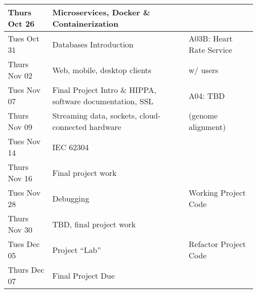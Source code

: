 \begin{longtable}[c]{|l|l|l|}
    Thurs Oct 26    & 
        Microservices, Docker \& Containerization & \\
    \hline
    Tues Oct 31     & 
        Databases Introduction & 
        A03B: Heart Rate Service \\
    Thurs Nov 02    & 
        Web, mobile, desktop clients & 
        w/ users\\
    \hline
    Tues Nov 07     & 
        Final Project Intro \& HIPPA, software documentation, SSL & 
        A04: TBD \\
    Thurs Nov 09    & 
        Streaming data, sockets, cloud-connected hardware & 
        (genome alignment) \\
    \hline
    Tues Nov 14     & 
        IEC 62304 & \\
    Thurs Nov 16    & 
        Final project work & \\
    \hline
    Tues Nov 28     & 
        Debugging & 
        Working Project Code \\
    Thurs Nov 30    & 
        TBD, final project work & \\
    \hline
    Tues Dec 05     & 
        Project ``Lab'' & 
        Refactor Project Code \\
    Thurs Dec 07    & 
        Final Project Due & \\
    \hline

\end{longtable}

